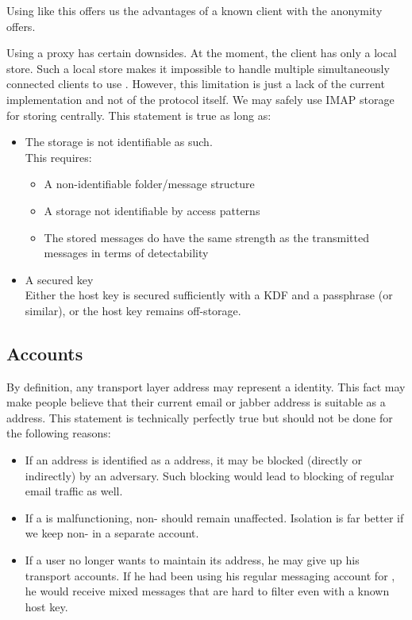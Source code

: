 Using \MessageVortex{} like this offers us the advantages of a known client with the anonymity \MessageVortex{} offers.

Using a proxy has certain downsides. At the moment, the \MessageVortex{} client has only a local store. Such a local store makes it impossible to handle multiple simultaneously connected clients to use \MessageVortex. However, this limitation is just a lack of the current implementation and not of the protocol itself. We may safely use IMAP storage for storing \VortexMessages{} centrally. This statement is true as long as:
\begin{itemize}
	\item The storage is not identifiable as such.\\
	This requires:
	\begin{itemize}
		\item A non-identifiable folder/message structure
		\item A storage not identifiable by access patterns
		\item The stored messages do have the same strength as the transmitted messages in terms of detectability
	\end{itemize}
	\item A secured key\\
	Either the host key is secured sufficiently with a KDF and a passphrase (or similar), or the host key remains off-storage.
\end{itemize}

\subsection{\MessageVortex{} Accounts}
By definition, any transport layer address may represent a \MessageVortex{} identity. This fact may make people believe that their current email or jabber address is suitable as a \MessageVortex address. This statement is technically perfectly true but should not be done for the following reasons:
\begin{itemize}
	\item If an address is identified as a \MessageVortex{} address, it may be blocked (directly or indirectly) by an adversary. Such blocking would lead to blocking of regular email traffic as well.
	\item If a \VortexNode{} is malfunctioning, non-\VortexMessages{} should remain unaffected. Isolation is far better if we keep non-\VortexMessages{} in a separate account.
	\item If a user no longer wants to maintain its \MessageVortex{} address, he may give up his \MessageVortex transport accounts. If he had been using his regular messaging account for \MessageVortex, he would receive mixed messages that are hard to filter even with a known host key.
\end{itemize}

